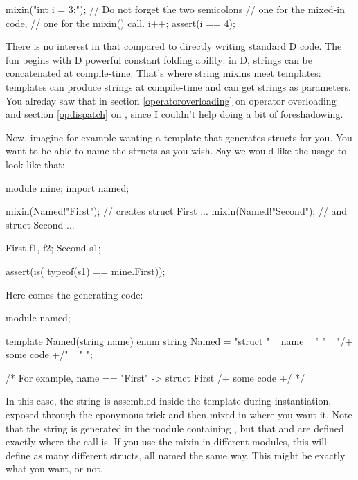 \begin{dcode}
mixin("int i = 3;"); // Do not forget the two semicolons
                     // one for the mixed-in code,
                     // one for the mixin() call.
i++;
assert(i == 4);
\end{dcode}

There is no interest in that compared to directly writing standard D code. The fun begins with D powerful constant folding ability: in D, strings can be concatenated at compile-time. That's where string mixins meet templates: templates can produce strings at compile-time and can get strings as parameters. You alreday saw that in section \ref{operatoroverloading} on operator overloading and section \ref{opdispatch} on , since I couldn't help doing a bit of foreshadowing.

Now, imagine for example wanting a template that generates structs for you. You want to be able to name the structs as you wish. Say we would like the usage to look like that:

\begin{dcode}
module mine;
import named;

mixin(Named!"First");  // creates struct First { ... }
mixin(Named!"Second"); // and struct Second { ... }

First f1, f2;
Second s1;

assert(is( typeof(s1) == mine.First));
\end{dcode}

Here comes the generating code:

\begin{dcode}
module named;

template Named(string name)
{
    enum string Named = "struct " ~ name ~ " { "
                      ~ "/+ some code +/"
                      ~ " }";
}

/* For example, name == "First" ->
   struct First { /+ some code +/ }
*/
\end{dcode}

In this case, the string is assembled inside the template during instantiation,  exposed through the eponymous trick and then mixed in where you want it. Note that the string is generated in the module containing , but that  and  are defined exactly where the \DD{()} call is. If you use the mixin in different modules, this will define as many different structs, all named the same way. This might be exactly what you want, or not.

